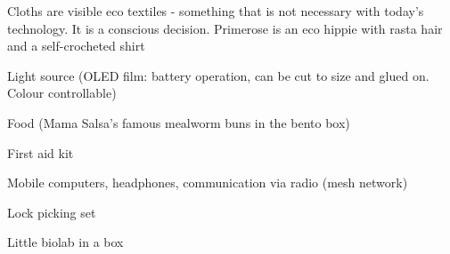 \begin{npcBox}[title=Primrose]
    \begin{consequences}
    \item {}
    \item {}
    \item {}
    \end{consequences}

    \begin{npcDescription}
    Cloths are visible eco textiles - something that is not necessary with today's technology. It is a conscious decision.
    Primerose is an eco hippie with rasta hair and a self-crocheted shirt
    \end{npcDescription}


    \begin{equipment}
    \item Light source (OLED film: battery operation, can be cut to size and glued on. Colour controllable)
    \item Food (Mama Salsa's famous mealworm buns in the bento box)
    \item First aid kit
    \item Mobile computers, headphones, communication via radio (mesh network)
    \item Lock picking set
    \item Little biolab in a box
    \end{equipment}
\end{npcBox}



